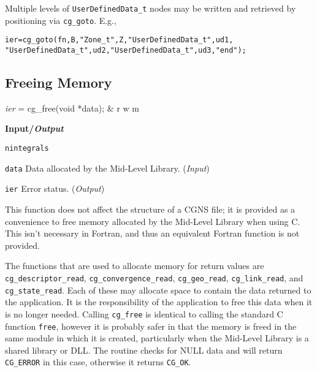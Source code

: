 Multiple levels of \texttt{UserDefinedData\_t} nodes may be written and
retrieved by positioning via \texttt{cg\_goto}.
E.g.,
\begin{alltt}
   ier = cg\_goto(fn, B, "Zone\_t", Z, "UserDefinedData\_t", ud1, 
                 "UserDefinedData\_t", ud2, "UserDefinedData\_t", ud3, "end");
\end{alltt}

\subsection{Freeing Memory}
\label{s:free}

\begin{fctbox}
\textcolor{output}{\textit{ier}} = cg\_free(\textcolor{input}{void *data}); & r w m \\
\end{fctbox}

\noindent
\textbf{\textcolor{input}{Input}/\textcolor{output}{\textit{Output}}}

\begin{Ventryi}{\texttt{nintegrals}}\raggedright
\item [\texttt{data}]
      Data allocated by the Mid-Level Library.
      (\textcolor{input}{\textit{Input}})
\item [\texttt{ier}]
      Error status.
      (\textcolor{output}{\textit{Output}})
\end{Ventryi}

This function does not affect the structure of a CGNS file; it is
provided as a convenience to free memory allocated by the Mid-Level
Library when using C.
This isn't necessary in Fortran, and thus an equivalent Fortran function
is not provided.

The functions that are used to allocate memory for return values are
\texttt{cg\_descriptor\_read}, \texttt{cg\_convergence\_read},
\texttt{cg\_geo\_read}, \texttt{cg\_link\_read}, and
\texttt{cg\_state\_read}.
Each of these may allocate space to contain the data returned
to the application.
It is the responsibility of the application to free this data when it is
no longer needed.
Calling \texttt{cg\_free} is identical to calling the standard C function
\texttt{free}, however it is probably safer in that the memory is
freed in the same module in which it is created, particularly when the
Mid-Level Library is a shared library or DLL.
The routine checks for NULL data and will return \texttt{CG\_ERROR} in
this case, otherwise it returns \texttt{CG\_OK}.
